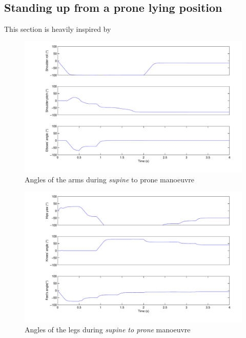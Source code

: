 \subsection{Standing up from a prone lying position}
This section is heavily inspired by \cite{Stuckler06}

\begin{figure}[htp]
\center
    \includegraphics[width = \textwidth]{figures/prone2standArms}
    \caption[Angles of the arms during \emph{supine} to prone manoeuvre]{Angles of the arms during \emph{supine} to prone manoeuvre}
    \label{fig:prone2standArms}
\end{figure}

\begin{figure}[htp]
\center
    \includegraphics[width = \textwidth]{figures/prone2standLegs}
    \caption[Angles of the legs during \emph{supine to prone} manoeuvre]{Angles of the legs during \emph{supine to prone} manoeuvre}
    \label{fig:prone2standLegs}
\end{figure}

